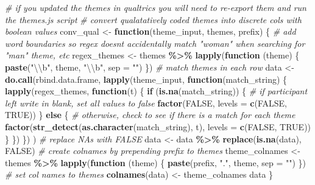 \documentclass[12pt,twoside]{reedthesis}
\newenvironment{Shaded}{\begin{snugshade}}{\end{snugshade}}
\newcommand{\CharTok}[1]{\textcolor[rgb]{0.31,0.60,0.02}{#1}}
\newcommand{\CommentTok}[1]{\textcolor[rgb]{0.56,0.35,0.01}{\textit{#1}}}
\newcommand{\ControlFlowTok}[1]{\textcolor[rgb]{0.13,0.29,0.53}{\textbf{#1}}}
\newcommand{\DataTypeTok}[1]{\textcolor[rgb]{0.13,0.29,0.53}{#1}}
\newcommand{\KeywordTok}[1]{\textcolor[rgb]{0.13,0.29,0.53}{\textbf{#1}}}
\newcommand{\NormalTok}[1]{#1}
\newcommand{\OperatorTok}[1]{\textcolor[rgb]{0.81,0.36,0.00}{\textbf{#1}}}
\newcommand{\OtherTok}[1]{\textcolor[rgb]{0.56,0.35,0.01}{#1}}
\newcommand{\StringTok}[1]{\textcolor[rgb]{0.31,0.60,0.02}{#1}}
\begin{document}
\begin{Shaded}
\begin{Highlighting}[]
\CommentTok{\# if you updated the themes in qualtrics you will need to re{-}export them and run the themes.js script}
\CommentTok{\# convert qualatatively coded themes into discrete cols with boolean values}
\NormalTok{conv\_qual \textless{}{-}}\StringTok{ }\ControlFlowTok{function}\NormalTok{(theme\_input, themes, prefix) \{}
  \CommentTok{\# add word boundaries so regex doesn\textquotesingle{}t accidentally match "woman" when searching for "man" theme, etc}
\NormalTok{  regex\_themes \textless{}{-}}\StringTok{ }\NormalTok{themes }\OperatorTok{\%\textgreater{}\%}\StringTok{ }\KeywordTok{lapply}\NormalTok{(}\ControlFlowTok{function}\NormalTok{ (theme) \{ }\KeywordTok{paste}\NormalTok{(}\StringTok{"}\CharTok{\textbackslash{}\textbackslash{}}\StringTok{b"}\NormalTok{, theme, }\StringTok{"}\CharTok{\textbackslash{}\textbackslash{}}\StringTok{b"}\NormalTok{, }\DataTypeTok{sep =} \StringTok{""}\NormalTok{) \})}
  \CommentTok{\# match themes in each row}
\NormalTok{  data \textless{}{-}}\StringTok{ }\KeywordTok{do.call}\NormalTok{(rbind.data.frame,}
    \KeywordTok{lapply}\NormalTok{(theme\_input, }\ControlFlowTok{function}\NormalTok{(match\_string) \{}
      \KeywordTok{lapply}\NormalTok{(regex\_themes, }\ControlFlowTok{function}\NormalTok{(t) \{}
        \ControlFlowTok{if}\NormalTok{ (}\KeywordTok{is.na}\NormalTok{(match\_string)) \{}
          \CommentTok{\# if participant left write in blank, set all values to false}
          \KeywordTok{factor}\NormalTok{(}\OtherTok{FALSE}\NormalTok{, }\DataTypeTok{levels =} \KeywordTok{c}\NormalTok{(}\OtherTok{FALSE}\NormalTok{, }\OtherTok{TRUE}\NormalTok{))}
\NormalTok{        \} }\ControlFlowTok{else}\NormalTok{ \{}
          \CommentTok{\# otherwise, check to see if there is a match for each theme}
          \KeywordTok{factor}\NormalTok{(}\KeywordTok{str\_detect}\NormalTok{(}\KeywordTok{as.character}\NormalTok{(match\_string), t), }\DataTypeTok{levels =} \KeywordTok{c}\NormalTok{(}\OtherTok{FALSE}\NormalTok{, }\OtherTok{TRUE}\NormalTok{))}
\NormalTok{        \}}
\NormalTok{      \})}
\NormalTok{    \})}
\NormalTok{  )}
  \CommentTok{\# replace NA\textquotesingle{}s with FALSE}
\NormalTok{  data \textless{}{-}}\StringTok{ }\NormalTok{data }\OperatorTok{\%\textgreater{}\%}
\StringTok{    }\KeywordTok{replace}\NormalTok{(}\KeywordTok{is.na}\NormalTok{(data), }\OtherTok{FALSE}\NormalTok{)}
  \CommentTok{\# create colnames by prepending prefix to themes}
\NormalTok{  theme\_colnames \textless{}{-}}\StringTok{ }\NormalTok{themes }\OperatorTok{\%\textgreater{}\%}\StringTok{ }\KeywordTok{lapply}\NormalTok{(}\ControlFlowTok{function}\NormalTok{ (theme) \{ }\KeywordTok{paste}\NormalTok{(prefix, }\StringTok{"."}\NormalTok{, theme, }\DataTypeTok{sep =} \StringTok{""}\NormalTok{) \})}
  \CommentTok{\# set col names to themes}
  \KeywordTok{colnames}\NormalTok{(data) \textless{}{-}}\StringTok{ }\NormalTok{theme\_colnames}
\NormalTok{  data}
\NormalTok{\}}


\end{Highlighting}
\end{Shaded}
\end{document}
